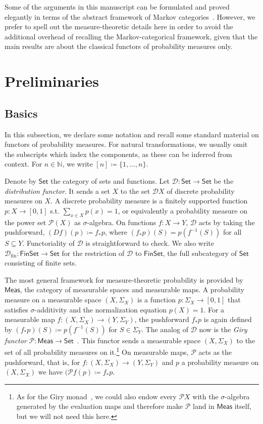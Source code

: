 \documentclass[11pt,a4paper]{scrartcl}
\newcommand{\setc}{\mathsf{Set}}
\newcommand{\finset}{\mathsf{FinSet}}
\newcommand{\meas}{\mathsf{Meas}}
\newcommand{\N}{\mathbb{N}}
\newcommand{\power}{\mathcal{P}}
\newcommand{\finiteset}[1]{[#1]}	%
\newcommand{\dist}{\mathcal{D}}
\newcommand{\distfin}{\mathcal{D}_{\mathrm{fin}}}
\newcommand{\giry}{\mathcal{P}}
\theoremstyle{definition}
\begin{document}
Some of the arguments in this manuscript can be formulated and proved elegantly in terms of the abstract framework of Markov categories~\cite{Fritz2020}.
However, we prefer to spell out the measure-theoretic details here in order to avoid the additional overhead of recalling the Markov-categorical framework,
given that the main results are about the classical functors of probability measures only.

\section{Preliminaries}

\subsection{Basics}

In this subsection, we declare some notation and recall some standard material on functors of probability measures.
For natural transformations, we usually omit the subscripts which index the components, as these can be inferred from context.
For $n \in \N$, we write $\finiteset{n} \coloneqq \{1,\ldots,n\}$.

Denote by $\setc$ the category of sets and functions. Let $\dist: \setc \rightarrow \setc$ be the \emph{distribution functor}. It sends a set $X$ to the set $\dist X$ of discrete probability measures on $X$. A discrete probability measure is a finitely supported function $p: X \rightarrow [0,1]$ s.t. $\sum_{x \in X} p(x) = 1$, 
or equivalently a probability measure on the power set $\power(X)$ as $\sigma$-algebra.
On functions $f : X \to Y$, $\dist$ acts by taking the pushforward, $(Df)(p) \coloneq f_\ast p$, where $(f_\ast p)(S) = p(f^{-1}(S))$ for all $S \subseteq Y$.
Functoriality of $\dist$ is straightforward to check.
We also write $\distfin : \finset \rightarrow \setc$ for the restriction of $\dist$ to $\finset$, the full subcategory of $\setc$ consisting of finite sets.

The most general framework for measure-theoretic probability is provided by $\meas$, the category of measurable spaces and measurable maps. A probability measure on a measurable space $(X,\Sigma_X)$ is a function $p: \Sigma_X \rightarrow [0,1]$ that satisfies $\sigma$-additivity and the normalization equation $p(X) = 1$.
For a measurable map $f:(X,\Sigma_X) \rightarrow (Y,\Sigma_Y)$, the pushforward $f_\ast p$ is again defined by $(f_\ast p)(S) \coloneq p(f^{-1}(S))$ for $S \in \Sigma_Y$. The analog of $\dist$ now is the \emph{Giry functor} $\giry: \meas \rightarrow \setc$~\cite{Giry1982}.
This functor sends a measurable space $(X,\Sigma_X)$ to the set of all probability measures on it.\footnote{As for the Giry monad~\cite{Giry1982}, we could also endow every $\giry X$ with the $\sigma$-algebra generated by the evaluation maps and therefore make $\giry$ land in $\meas$ itself,
but we will not need this here.}
On measurable maps, $\giry$ acts as the pushforward, that is, for $f: (X,\Sigma_X) \rightarrow (Y,\Sigma_Y)$ and $p$ a probability measure on $(X,\Sigma_X)$ we have $(\giry f (p) \coloneq f_\ast p$.
\end{document}
